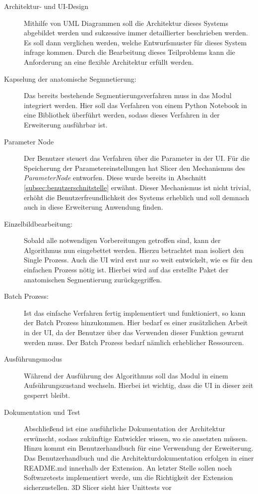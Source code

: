 \begin{description}
	\item[Architektur- und \ac{UI}-Design] Mithilfe von UML Diagrammen soll die Architektur
		dieses Systems abgebildet werden und sukzessive immer detaillierter beschrieben
		werden. Es soll dann verglichen werden, welche Entwurfsmuster für dieses System
		infrage kommen. Durch die Bearbeitung dieses Teilproblems kann die
		Anforderung an eine flexible Architektur erfüllt werden.

	\item[Kapselung der anatomische Segmnetierung:] Das bereits bestehende Segmentierungsverfahren
		muss in das Modul integriert werden. Hier soll das Verfahren von einem
		Python Notebook in eine Bibliothek überführt werden, sodass dieses Verfahren
		in der Erweiterung ausführbar ist.

	\item[Parameter Node] Der Benutzer steuert das Verfahren über die Parameter in
		der \ac{UI}. Für die Speicherung der Parametereinstellungen hat Slicer den Mechanismus
		des \textit{ParameterNode} entworfen. Diese wurde bereits in Abschnitt \ref{subsec:benutzerschnitstelle}
		erwähnt. Dieser Mechanismus ist nicht trivial, erhöht die Benutzerfreundlichkeit
		des Systems erheblich und soll demnach auch in diese Erweiterung Anwendung finden.

	\item[Einzelbildbearbeitung:] Sobald alle notwendigen Vorbereitungen getroffen
		sind, kann der Algorithmus nun eingebettet werden. Hierzu betrachtet man isoliert
		den Single Prozess. Auch die \ac{UI} wird erst nur so weit entwickelt, wie
		es für den einfachen Prozess nötig ist. Hierbei wird auf das erstellte Paket
		der anatomischen Segmentierung zurückgegriffen.

	\item[Batch Prozess:] Ist das einfache Verfahren fertig implementiert und funktioniert,
		so kann der Batch Prozess hinzukommen. Hier bedarf es einer zusätzlichen Arbeit
		in der \ac{UI}, da der Benutzer über das Verwenden dieser Funktion gewarnt werden
		muss. Der Batch Prozess bedarf nämlich erheblicher Ressourcen.

	\item[Ausführungsmodus] Während der Ausführung des Algorithmus soll das Modul in
		einem Aufsührungszustand wechseln. Hierbei ist wichtig, dass die UI in dieser
		zeit gesperrt bleibt.

	\item[Dokumentation und Test] Abschließend ist eine ausführliche Dokumentation
		der Architektur erwünscht, sodass zukünftige Entwickler wissen, wo sie ansetzten
		müssen. Hinzu kommt ein Benutzerhandbuch für eine Verwendung der Erweiterung.
		Das Benutzerhandbuch und die Architekturdokumentation erfolgen in einer README.md
		innerhalb der Extension. An letzter Stelle sollen noch Softwaretests
		implementiert werde, um die Richtigkeit der Extension sicherzustellen. 3D
		Slicer sieht hier Unittests vor
\end{description}

